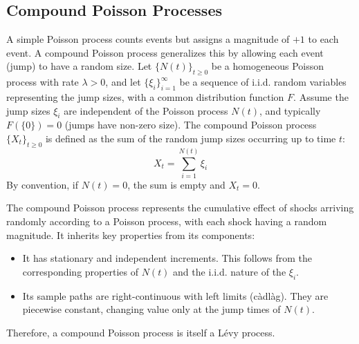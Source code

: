 \documentclass[11pt,twoside,openright]{report}
\begin{document}
\subsection{Compound Poisson Processes}
\label{subsec:compound_poisson}

A simple Poisson process counts events but assigns a magnitude of $+1$ to each event. A compound Poisson process generalizes this by allowing each event (jump) to have a random size. Let $\{N(t)\}_{t \ge 0}$ be a homogeneous Poisson process with rate $\lambda > 0$, and let $\{\xi_i\}_{i=1}^\infty$ be a sequence of i.i.d. random variables representing the jump sizes, with a common distribution function $F$. Assume the jump sizes $\xi_i$ are independent of the Poisson process $N(t)$, and typically $F(\{0\}) = 0$ (jumps have non-zero size). The compound Poisson process $\{X_t\}_{t \ge 0}$ is defined as the sum of the random jump sizes occurring up to time $t$:
\[ X_t = \sum_{i=1}^{N(t)} \xi_i \]
By convention, if $N(t)=0$, the sum is empty and $X_t = 0$.

The compound Poisson process represents the cumulative effect of shocks arriving randomly according to a Poisson process, with each shock having a random magnitude. It inherits key properties from its components:
\begin{itemize}
    \item It has stationary and independent increments. This follows from the corresponding properties of $N(t)$ and the i.i.d. nature of the $\xi_i$.
    \item Its sample paths are right-continuous with left limits (càdlàg). They are piecewise constant, changing value only at the jump times of $N(t)$.
\end{itemize}
Therefore, a compound Poisson process is itself a Lévy process.

\end{document}
